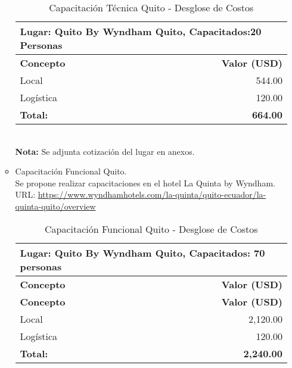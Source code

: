 \begin{itemize}
\begin{itemize}
\begin{table}[h]
                \centering
                \begin{tabular}{|l|r|}
                    \hline
                    \multicolumn{2}{|l|}{Lugar: Quito By Wyndham Quito, Capacitados:20 Personas} \\
                    \hline
                    \textbf{Concepto} & \textbf{Valor (USD)} \\
                    \hline
                    Local & 544.00 \\
                    \hline
                    Logística & 120.00 \\
                    \hline
                    \textbf{Total:} & \textbf{664.00} \\
                    \hline
                \end{tabular}
                \caption{Capacitación Técnica Quito - Desglose de Costos}
                \label{tab:capacitacion-quito-tecnica}
            \end{table} \\
        \textbf{Nota:} Se adjunta cotización del lugar en anexos.\\
        \newpage
        \item Capacitación Funcional Quito.\\
            Se propone realizar capacitaciones en el hotel La Quinta by Wyndham.\\
            URL: \url{https://www.wyndhamhotels.com/la-quinta/quito-ecuador/la-quinta-quito/overview}\\
            \begin{table}[h]
                \centering
                \begin{tabular}{|l|r|}
                    \hline
                    \multicolumn{2}{|l|}{Lugar: Quito By Wyndham Quito, Capacitados: 70 personas} \\
                    \hline
                    \textbf{Concepto} & \textbf{Valor (USD)} \\
                    \hline
                    \textbf{Concepto} & \textbf{Valor (USD)} \\
                    \hline   Local & 2,120.00 \\
                    Logística & 120.00 \\
                    \hline
                    \textbf{Total:} & \textbf{2,240.00} \\
                    \hline
                \end{tabular}
                \caption{Capacitación Funcional Quito - Desglose de Costos}

\end{table}
\end{itemize}
\end{itemize}
